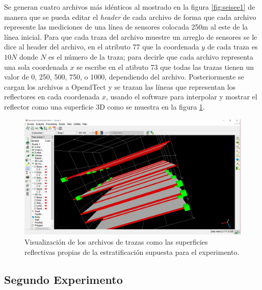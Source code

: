 \documentclass[%
 aip,
 jmp,%
 amsmath,amssymb,
 reprint,%
]{revtex4-1}
\begin{document}
Se generan cuatro archivos más idénticos al mostrado en la figura \ref{fig:seisee1} de manera que se pueda editar el \textit{header} de cada archivo de forma que cada archivo represente las mediciones de una línea de sensores colocada 250m al este de la línea inicial. Para que cada traza del archivo muestre un arreglo de sensores se le dice al header del archivo, en el atributo 77 que la coordenada $y$ de cada traza es $10N$ donde $N$ es el número de la traza; para decirle que cada archivo representa una sola coordenada $x$ se escribe en el atibuto 73 que todas las trazas tienen un valor de 0, 250, 500, 750, o 1000, dependiendo del archivo. Posteriormente se cargan los archivos a OpendTect y se trazan las líneas que representan los reflectores en cada coordenada $x$, usando el software para interpolar y mostrar el reflector como una superficie 3D como se muestra en la figura \ref{fig:opend1}.

\begin{figure}[!h]
	\centering
	\includegraphics[width=1.\linewidth]{opend1.png}
	\caption{Visualización de los archivos de trazas como las superficies reflectivas propias de la estratificación supuesta para el experimento.}
	\label{fig:opend1}
\end{figure}

\subsection{Segundo Experimento}
\end{document}
